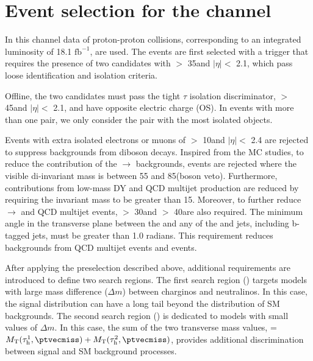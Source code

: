\section{\texorpdfstring{Event selection for the \tauTau channel}{Event selection for the tau-tau channel}}
\label{sect:tauTauCuts}
In this channel data of proton-proton collisions,  corresponding to an integrated luminosity of 18.1 $\mathrm{fb}^{-1}$, are used.
The events are first selected with a trigger \cite{Chatrchyan:2011nv} that requires the presence of
two \Tau candidates with \PT $>$ 35\GeV and $|\eta|<$ 2.1, which pass loose identification and isolation criteria.

Offline, %
the two \Tau candidates must pass the tight $\tau$ isolation discriminator,
\PT $>$ 45\GeV and $|\eta|<$ 2.1, and have opposite electric charge (OS).
In events with more than one \tauTau pair, we only consider the pair with the most isolated \Tau objects. 

Events with extra isolated electrons or muons of \PT $>$ 10\GeV and $|\eta| <$ 2.4 
are rejected to suppress %
backgrounds from diboson decays.
Inspired from the MC studies, to reduce the contribution of the \Z$ \rightarrow$ \tauTau backgrounds, events are  rejected where the visible
di-\Tau invariant mass is between 55 and 85\GeV (\Z boson veto).  
Furthermore, contributions from low-mass DY and QCD multijet production are 
reduced by requiring the invariant mass to be greater than 15\GeV.
Moreover, to further reduce \Z $\rightarrow$ \tauTau and QCD multijet events, %
\MPT $>$ 30\GeV and \mttwo $>$ 40\GeV are also required.
The minimum angle \deltaphi in the transverse plane between the \ptvecmiss and any of the \Tau and jets, 
including b-tagged jets, must be greater than 1.0 radians. 
This requirement reduces backgrounds from QCD multijet events and \wjets events.

After applying the preselection described above,
additional requirements are introduced to define two search regions.
The first search region (\binone) targets models with large mass difference ($\Delta m$) 
between charginos and neutralinos.
In this case, the \mttwo signal distribution can have a long tail beyond the 
distribution of SM backgrounds.
The second search region (\bintwo) is dedicated to models with small values of $\Delta m$.
In this case, the sum of the two transverse mass values, \SumMT = $\mt(\Tau^1,\ptvecmiss) + \mt(\Tau^2,\ptvecmiss)$, 
provides additional discrimination between signal and SM background processes.


